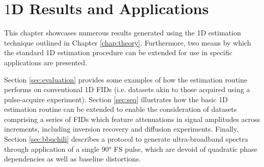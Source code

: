 \chapter{$1$D Results and Applications}
\label{chap:results}

This chapter showcases numerous results generated using the \ac{1D} estimation
technique outlined in Chapter \ref{chap:theory}. Furthermore, two means by
which the standard \ac{1D} estimation procedure can be extended for use in
specific applications are presented.

Section \ref{sec:evaluation} provides some examples of how the estimation
routine performs on conventional \ac{1D} \acp{FID} (i.e. datasets akin to those
acquired using a pulse-acquire experiment). Section \ref{sec:seq} illustrates
how the basic \ac{1D} estimation routine can be extended to enable the
consideration of datasets comprising a series of \acp{FID} which
feature attenuations in signal amplitudes across increments, including inversion
recovery and diffusion experiments. Finally, Section \ref{sec:bbqchili}
describes a protocol to generate ultra-broadband spectra through application of
a single \ang{90} \acl{FS} pulse, which are devoid of quadratic phase
dependencies as well as baseline distortions.





